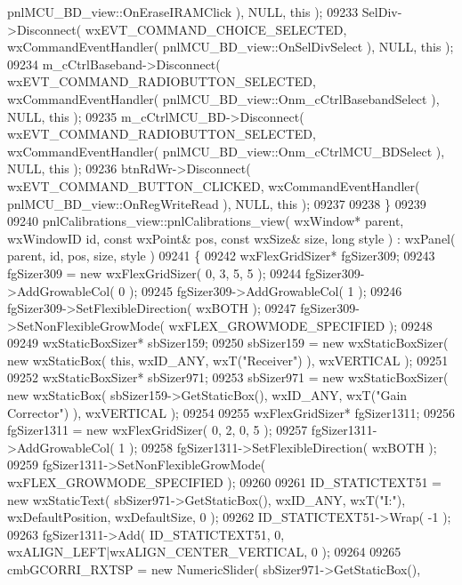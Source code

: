 \begin{DoxyCode}
      pnlMCU_BD_view::OnEraseIRAMClick ), NULL, \textcolor{keyword}{this} );
09233     SelDiv->Disconnect( wxEVT\_COMMAND\_CHOICE\_SELECTED, wxCommandEventHandler( 
      pnlMCU_BD_view::OnSelDivSelect ), NULL, \textcolor{keyword}{this} );
09234     m_cCtrlBaseband->Disconnect( wxEVT\_COMMAND\_RADIOBUTTON\_SELECTED, wxCommandEventHandler( 
      pnlMCU_BD_view::Onm_cCtrlBasebandSelect ), NULL, \textcolor{keyword}{this} );
09235     m_cCtrlMCU_BD->Disconnect( wxEVT\_COMMAND\_RADIOBUTTON\_SELECTED, wxCommandEventHandler( 
      pnlMCU_BD_view::Onm_cCtrlMCU_BDSelect ), NULL, \textcolor{keyword}{this} );
09236     btnRdWr->Disconnect( wxEVT\_COMMAND\_BUTTON\_CLICKED, wxCommandEventHandler( 
      pnlMCU_BD_view::OnRegWriteRead ), NULL, \textcolor{keyword}{this} );
09237     
09238 \}
09239 
09240 pnlCalibrations_view::pnlCalibrations_view( wxWindow* parent, wxWindowID \textcolor{keywordtype}{id}, \textcolor{keyword}{const} wxPoint& pos, \textcolor{keyword}{const} 
      wxSize& size, \textcolor{keywordtype}{long} style ) : wxPanel( parent, id, pos, size, style )
09241 \{
09242     wxFlexGridSizer* fgSizer309;
09243     fgSizer309 = \textcolor{keyword}{new} wxFlexGridSizer( 0, 3, 5, 5 );
09244     fgSizer309->AddGrowableCol( 0 );
09245     fgSizer309->AddGrowableCol( 1 );
09246     fgSizer309->SetFlexibleDirection( wxBOTH );
09247     fgSizer309->SetNonFlexibleGrowMode( wxFLEX\_GROWMODE\_SPECIFIED );
09248     
09249     wxStaticBoxSizer* sbSizer159;
09250     sbSizer159 = \textcolor{keyword}{new} wxStaticBoxSizer( \textcolor{keyword}{new} wxStaticBox( \textcolor{keyword}{this}, wxID\_ANY, wxT(\textcolor{stringliteral}{"Receiver"}) ), wxVERTICAL );
09251     
09252     wxStaticBoxSizer* sbSizer971;
09253     sbSizer971 = \textcolor{keyword}{new} wxStaticBoxSizer( \textcolor{keyword}{new} wxStaticBox( sbSizer159->GetStaticBox(), wxID\_ANY, wxT(\textcolor{stringliteral}{"Gain
       Corrector"}) ), wxVERTICAL );
09254     
09255     wxFlexGridSizer* fgSizer1311;
09256     fgSizer1311 = \textcolor{keyword}{new} wxFlexGridSizer( 0, 2, 0, 5 );
09257     fgSizer1311->AddGrowableCol( 1 );
09258     fgSizer1311->SetFlexibleDirection( wxBOTH );
09259     fgSizer1311->SetNonFlexibleGrowMode( wxFLEX\_GROWMODE\_SPECIFIED );
09260     
09261     ID_STATICTEXT51 = \textcolor{keyword}{new} wxStaticText( sbSizer971->GetStaticBox(), wxID\_ANY, wxT(\textcolor{stringliteral}{"I:"}), wxDefaultPosition,
       wxDefaultSize, 0 );
09262     ID_STATICTEXT51->Wrap( -1 );
09263     fgSizer1311->Add( ID_STATICTEXT51, 0, wxALIGN\_LEFT|wxALIGN\_CENTER\_VERTICAL, 0 );
09264     
09265     cmbGCORRI_RXTSP = \textcolor{keyword}{new} NumericSlider( sbSizer971->GetStaticBox(), 

\end{DoxyCode}
